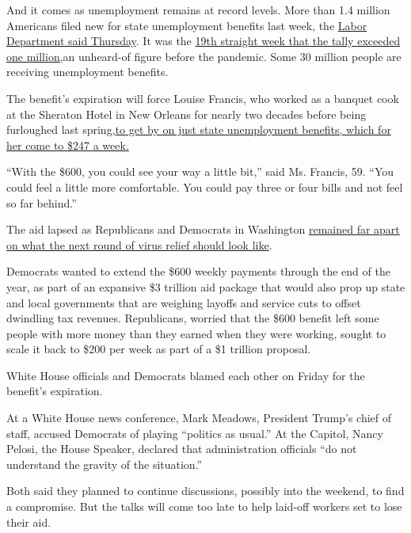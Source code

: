 And it comes as unemployment remains at record levels. More than 1.4
million Americans filed new for state unemployment benefits last week,
the \href{https://oui.doleta.gov/press/2020/073020.pdf}{Labor Department
said Thursday}. It was the
\href{https://www.nytimes3xbfgragh.onion/2020/07/30/business/economy/q2-gdp-coronavirus-economy.html}{19th
straight week that the tally exceeded one million,}an unheard-of figure
before the pandemic. Some 30 million people are receiving unemployment
benefits.

The benefit's expiration will force Louise Francis, who worked as a
banquet cook at the Sheraton Hotel in New Orleans for nearly two decades
before being furloughed last
spring,\href{https://www.nytimes3xbfgragh.onion/2020/07/30/business/economy/q2-gdp-coronavirus-economy.html}{to
get by on just state unemployment benefits, which for her come to \$247
a week.}

``With the \$600, you could see your way a little bit,'' said Ms.
Francis, 59. ``You could feel a little more comfortable. You could pay
three or four bills and not feel so far behind.''

The aid lapsed as Republicans and Democrats in Washington
\href{https://www.nytimes3xbfgragh.onion/2020/07/28/us/politics/coronavirus-relief-bills-house-senate.html}{remained
far apart on what the next round of virus relief should look like}.

Democrats wanted to extend the \$600 weekly payments through the end of
the year, as part of an expansive \$3 trillion aid package that would
also prop up state and local governments that are weighing layoffs and
service cuts to offset dwindling tax revenues. Republicans, worried that
the \$600 benefit left some people with more money than they earned when
they were working, sought to scale it back to \$200 per week as part of
a \$1 trillion proposal.

White House officials and Democrats blamed each other on Friday for the
benefit's expiration.

At a White House news conference, Mark Meadows, President Trump's chief
of staff, accused Democrats of playing ``politics as usual.'' At the
Capitol, Nancy Pelosi, the House Speaker, declared that administration
officials ``do not understand the gravity of the situation.''

Both said they planned to continue discussions, possibly into the
weekend, to find a compromise. But the talks will come too late to help
laid-off workers set to lose their aid.

